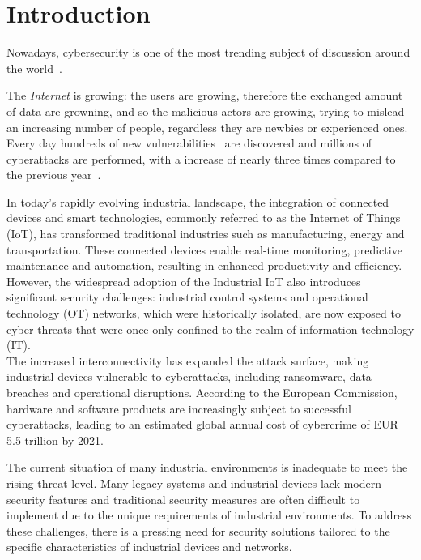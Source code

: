 \chapter{Introduction}
\label{cha:intro}

Nowadays, cybersecurity is one of the most trending subject of discussion around the world~\cite{trends-computer-science}.

The \textit{Internet} is growing: the users are growing, therefore the exchanged amount of data are growning, and so the malicious actors are growing, trying to mislead an increasing number of people, regardless they are newbies or experienced ones. Every day hundreds of new vulnerabilities~\cite{cve-details-db} are discovered and millions of cyberattacks are performed, with a increase of nearly three times compared to the previous year~\cite{cybersecurity-attacks}.

In today's rapidly evolving industrial landscape, the integration of connected devices and smart technologies, commonly referred to as the Internet of Things (IoT), has transformed traditional industries such as manufacturing, energy and transportation. These connected devices enable real-time monitoring, predictive maintenance and automation, resulting in enhanced productivity and efficiency. \\
However, the widespread adoption of the Industrial IoT also introduces significant security challenges: industrial control systems and operational technology (OT) networks, which were historically isolated, are now exposed to cyber threats that were once only confined to the realm of information technology (IT). \\
The increased interconnectivity has expanded the attack surface, making industrial devices vulnerable to cyberattacks, including ransomware, data breaches and operational disruptions. According to the European Commission, hardware and software products are increasingly subject to successful cyberattacks, leading to an estimated global annual cost of cybercrime of EUR 5.5 trillion by 2021.~\cite{cra-eu}

The current situation of many industrial environments is inadequate to meet the rising threat level. Many legacy systems and industrial devices lack modern security features and traditional security measures are often difficult to implement due to the unique requirements of industrial environments. To address these challenges, there is a pressing need for security solutions tailored to the specific characteristics of industrial devices and networks.

